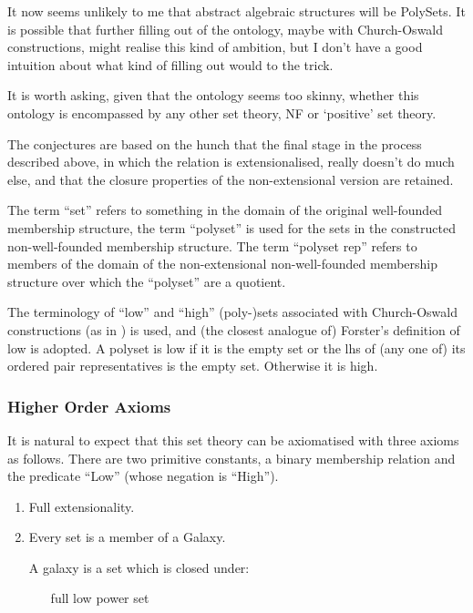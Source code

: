 \documentclass{article}
\begin{document}
\begin{article}
It now seems unlikely to me that abstract algebraic structures will be PolySets.
It is possible that further filling out of the ontology, maybe with Church-Oswald constructions, might realise this kind of ambition, but I don't have a good intuition about what kind of filling out would to the trick.

It is worth asking, given that the ontology seems too skinny, whether this ontology is encompassed by any other set theory, NF or `positive' set theory.

The conjectures are based on the hunch that the final stage in the process described above, in which the relation is extensionalised, really doesn't do much else, and that the closure properties of the non-extensional version are retained.

The term ``set'' refers to something in the domain of the original well-founded membership structure, the term ``polyset'' is used for the sets in the constructed non-well-founded membership structure.
The term ``polyset rep'' refers to members of the domain of the non-extensional non-well-founded membership structure over which the ``polyset'' are a quotient. 

The terminology of ``low'' and ``high'' (poly-)sets associated with Church-Oswald constructions (as in \cite{forster92,forster2005}) is used, and (the closest analogue of) Forster's definition of low is adopted.
A polyset is low if it is the empty set or the lhs of (any one of) its ordered pair representatives is the empty set.
Otherwise it is high.

\subsubsection{Higher Order Axioms}

It is natural to expect that this set theory can be axiomatised with three axioms as follows.
There are two primitive constants, a binary membership relation and the predicate ``Low'' (whose negation is ``High'').

\begin{enumerate}
\item Full extensionality.

\item Every set is a member of a Galaxy.

A galaxy is a set which is closed under:

\begin{itemize}
\item [full low power set]\ 


\end{itemize}
\end{enumerate}
\end{article}
\end{document}
